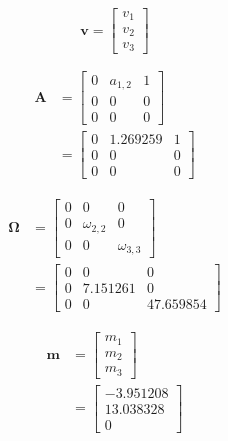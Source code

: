 \documentclass[
]{book}
\begin{document}
\begin{equation}
  \mathbf{v}
  =
  \begin{bmatrix}
    v_1 \\
    v_2 \\
    v_3
  \end{bmatrix}
\end{equation}

\begin{equation}
  \begin{split}
    \mathbf{A}
    &=
    \begin{bmatrix}
      0 & a_{1, 2} & 1 \\
      0 & 0        & 0 \\
      0 & 0        & 0
    \end{bmatrix} \\
    &=
    \begin{bmatrix}
      0 & 1.269259 & 1 \\
      0 & 0 & 0 \\
      0 & 0 & 0
    \end{bmatrix}
  \end{split}
\end{equation}

\begin{equation}
  \begin{split}
    \boldsymbol{\Omega}
    &=
    \begin{bmatrix}
      0 & 0             & 0 \\
      0 & \omega_{2, 2} & 0 \\
      0 & 0             & \omega_{3, 3}
    \end{bmatrix} \\
    &=
    \begin{bmatrix}
      0 & 0 & 0 \\
      0 & 7.151261 & 0 \\
      0 & 0 & 47.659854
    \end{bmatrix}
  \end{split}
\end{equation}

\begin{equation}
  \begin{split}
    \mathbf{m}
    &=
    \begin{bmatrix}
      m_1 \\
      m_2 \\
      m_3
    \end{bmatrix} \\
    &=
    \begin{bmatrix}
      -3.951208 \\
      13.038328 \\
      0
    \end{bmatrix}
  \end{split}
\end{equation}
\end{document}
